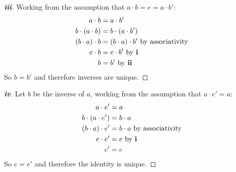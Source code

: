 \documentclass[../main.tex]{subfiles}
\begin{document}
\begin{proof}[\textbf{iii}]
  Working from the assumption that $a \cdot b = e = a \cdot b'$:
  \begin{align*}
    a \cdot b &= a \cdot b' \\
    b \cdot (a\cdot b) &= b \cdot (a \cdot b') \\
    (b \cdot a) \cdot b &= (b \cdot a) \cdot b' \text{ by associativity}\\
    e \cdot b &= e \cdot b' \text{ by \textbf{i}} \\
    b &= b' \text{ by \textbf{ii}} 
  \end{align*} 
  So $b = b'$ and therefore inverses are unique.
\end{proof}
\begin{proof}[\textbf{iv}]
  Let $b$ be the inverse of $a$, working from the assumption that $a \cdot e' = a$:
  \begin{align*}
    a \cdot e' &= a \\
    b \cdot (a \cdot e') &= b \cdot a\\
    (b \cdot a) \cdot e' &= b \cdot a \text{ by associativity} \\
    e \cdot e' &= e \text{ by \textbf{i}} \\
    e' &= e
  \end{align*} 
  So $e = e'$ and therefore the identity is unique.
\end{proof}
\end{document}
